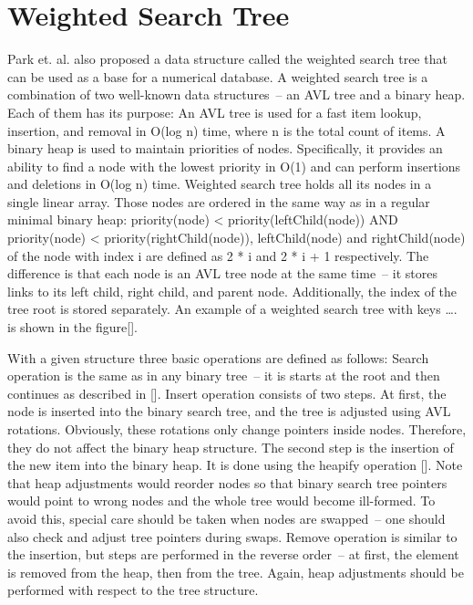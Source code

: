 \section{Weighted Search Tree}

Park et. al. also proposed a data structure called the weighted search tree that can be used as a base for a numerical database. A weighted search tree is a combination of two well-known data structures~-- an AVL tree and a binary heap. Each of them has its purpose:
An AVL tree is used for a fast item lookup, insertion, and removal in O(log n) time, where n is the total count of items.
A binary heap is used to maintain priorities of nodes. Specifically, it provides an ability to find a node with the lowest priority in O(1) and can perform insertions and deletions in O(log n) time.
Weighted search tree holds all its nodes in a single linear array. Those nodes are ordered in the same way as in a regular minimal binary heap:
priority(node) < priority(leftChild(node)) AND
priority(node) < priority(rightChild(node)),
leftChild(node) and rightChild(node) of the node with index i are defined as 2 * i  and 2 * i + 1 respectively.
The difference is that each node is an AVL tree node at the same time~-- it stores links to its left child, right child, and parent node. Additionally, the index of the tree root is stored separately. An example of a weighted search tree with keys …. is shown in the figure[].

With a given structure three basic operations are defined as follows:
Search operation is the same as in any binary tree~-- it is starts at the root and then continues as described in [].
Insert operation consists of two steps. At first, the node is inserted into the binary search tree, and the tree is adjusted using AVL rotations. Obviously, these rotations only change pointers inside nodes. Therefore, they do not affect the binary heap structure. The second step is the insertion of the new item into the binary heap. It is done using the heapify operation []. Note that heap adjustments would reorder nodes so that binary search tree pointers would point to wrong nodes and the whole tree would become ill-formed. To avoid this, special care should be taken when nodes are swapped~-- one should also check and adjust tree pointers during swaps.
Remove operation is similar to the insertion, but steps are performed in the reverse order~-- at first, the element is removed from the heap, then from the tree. Again, heap adjustments should be performed with respect to the tree structure.


